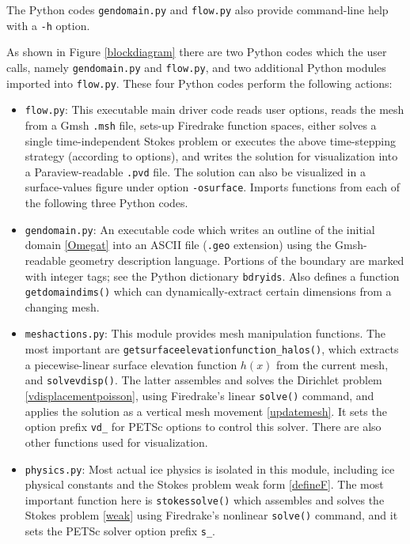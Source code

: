 \documentclass[letterpaper,final,12pt,reqno]{amsart}
\begin{document}
\medskip
\noindent The Python codes \texttt{gendomain.py} and \texttt{flow.py} also provide command-line help with a \texttt{-h} option.

\medskip
As shown in Figure \ref{blockdiagram} there are two Python codes which the user calls, namely \texttt{gendomain.py} and \texttt{flow.py}, and two additional Python modules imported into \texttt{flow.py}.  These four Python codes perform the following actions:
\begin{itemize}
\item \texttt{flow.py}: \quad  This executable main driver code reads user options, reads the mesh from a Gmsh \texttt{.msh} file, sets-up Firedrake function spaces, either solves a single time-independent Stokes problem or executes the above time-stepping strategy (according to options), and writes the solution for visualization into a Paraview-readable \texttt{.pvd} file.  The solution can also be visualized in a surface-values figure under option \texttt{-osurface}.  Imports functions from each of the following three Python codes.
\item \texttt{gendomain.py}: \quad  An executable code which writes an outline of the initial domain \eqref{Omegat} into an ASCII file (\texttt{.geo} extension) using the Gmsh-readable geometry description language.  Portions of the boundary are marked with integer tags; see the Python dictionary \texttt{bdryids}.  Also defines a function \texttt{getdomaindims()} which can dynamically-extract certain dimensions from a changing mesh.
\item \texttt{meshactions.py}: \quad  This module provides mesh manipulation functions.  The most important  are \texttt{getsurfaceelevationfunction\_halos()}, which extracts a piecewise-linear surface elevation function $h(x)$ from the current mesh, and \texttt{solvevdisp()}.  The latter assembles and solves the Dirichlet problem \eqref{vdisplacementpoisson}, using Firedrake's linear \texttt{solve()} command, and applies the solution as a vertical mesh movement \eqref{updatemesh}.  It sets the option prefix \texttt{vd\_} for PETSc options to control this solver.  There are also other functions used for visualization.
\item \texttt{physics.py}: \quad  Most actual ice physics is isolated in this module, including ice physical constants and the Stokes problem weak form \eqref{defineF}.  The most important function here is \texttt{stokessolve()} which assembles and solves the Stokes problem \eqref{weak} using Firedrake's nonlinear \texttt{solve()} command, and it sets the PETSc solver option prefix \texttt{s\_}.
\end{itemize}
\end{document}
